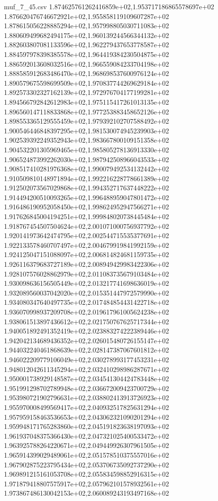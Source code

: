 \begin{filecontents*}{muf_7_45.csv}
1.874625761262416859e+02,1.953717186865578697e+02
1.876620476746672921e+02,1.955858119109607287e+02
1.878615056228885294e+02,1.957998805030711083e+02
1.880609499682494175e+02,1.960139244566344132e+02
1.882603807081133596e+02,1.962279437653778587e+02
1.884597978398385578e+02,1.964419384230504875e+02
1.886592013608032516e+02,1.966559084233704198e+02
1.888585912683486470e+02,1.968698537600976124e+02
1.890579675598699509e+02,1.970837744269629184e+02
1.892573302327162139e+02,1.972976704177199281e+02
1.894566792842612983e+02,1.975115417261013135e+02
1.896560147118833868e+02,1.977253883458652126e+02
1.898553365129555459e+02,1.979392102707588492e+02
1.900546446848397295e+02,1.981530074945239903e+02
1.902539392249352943e+02,1.983667800109151358e+02
1.904532201305969465e+02,1.985805278136913330e+02
1.906524873992262030e+02,1.987942508966043533e+02
1.908517410281976368e+02,1.990079492534132442e+02
1.910509810148971894e+02,1.992216228778661389e+02
1.912502073567029868e+02,1.994352717637448222e+02
1.914494200510093265e+02,1.996488959047801472e+02
1.916486190952058450e+02,1.998624952947566271e+02
1.917626845004194251e+02,1.999848020738445484e+02
1.918767454507504624e+02,2.001071000756937792e+02
1.920141973642474795e+02,2.002544715535377691e+02
1.922133578460707497e+02,2.004679919841992159e+02
1.924125047151088097e+02,2.006814824681159735e+02
1.926116379683727189e+02,2.008949429983422306e+02
1.928107576028862979e+02,2.011083735679103484e+02
1.930098636156505449e+02,2.013217741698636019e+02
1.932089560037042020e+02,2.015351447972579990e+02
1.934080347640497735e+02,2.017484854431422718e+02
1.936070998937209708e+02,2.019617961005624238e+02
1.938061513897436612e+02,2.021750767625717344e+02
1.940051892491352419e+02,2.023883274222389446e+02
1.942042134689436352e+02,2.026015480726155147e+02
1.944032240461868639e+02,2.028147387067601812e+02
1.946022209779106049e+02,2.030278993177453231e+02
1.948012042611345294e+02,2.032410298986287671e+02
1.950001738929148587e+02,2.034541304424783448e+02
1.951991298702789948e+02,2.036672009423700729e+02
1.953980721902796631e+02,2.038802413913726923e+02
1.955970008499569417e+02,2.040932517825631294e+02
1.957959158463536653e+02,2.043062321090201294e+02
1.959948171765283860e+02,2.045191823638197093e+02
1.961937048375366430e+02,2.047321025400533472e+02
1.963925788264220671e+02,2.049449926307961505e+02
1.965914399029489061e+02,2.051578510375557016e+02
1.967902875223795434e+02,2.053706735092737290e+02
1.969891215161053708e+02,2.055834598852916315e+02
1.971879418807575917e+02,2.057962101578932561e+02
1.973867486130042153e+02,2.060089243193497168e+02

\end{filecontents*}
